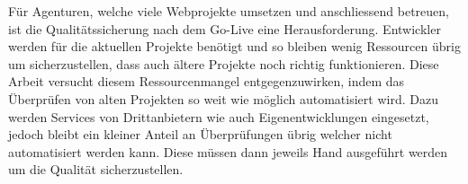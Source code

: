 Für Agenturen, welche viele Webprojekte umsetzen und anschliessend betreuen, ist die Qualitätssicherung nach dem Go-Live eine Herausforderung. Entwickler werden für die aktuellen Projekte benötigt und so bleiben wenig Ressourcen übrig um sicherzustellen, dass auch ältere Projekte noch richtig funktionieren. Diese Arbeit versucht diesem Ressourcenmangel entgegenzuwirken, indem das Überprüfen von alten Projekten so weit wie möglich automatisiert wird. Dazu werden Services von Drittanbietern wie auch Eigenentwicklungen eingesetzt, jedoch bleibt ein kleiner Anteil an Überprüfungen übrig welcher nicht automatisiert werden kann. Diese müssen dann jeweils Hand ausgeführt werden um die Qualität sicherzustellen. 
